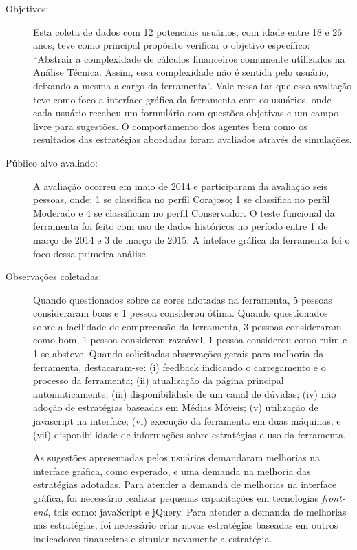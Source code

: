 \begin{description}

\item[Objetivos:]
Esta coleta de dados com 12 potenciais usuários, com idade entre 18 e 26 anos, teve como principal propósito verificar o objetivo específico: “Abstrair a complexidade de cálculos financeiros comumente utilizados na Análise Técnica. Assim, essa complexidade não é sentida pelo usuário, deixando a mesma a cargo da ferramenta”. Vale ressaltar que essa avaliação teve como foco a interface gráfica da ferramenta com os usuários, onde cada usuário recebeu um formulário com questões objetivas e um campo livre para sugestões. O comportamento dos agentes bem como os resultados das estratégias abordadas foram avaliados através de simulações.

\item[Público alvo avaliado:]

A avaliação ocorreu em maio de 2014 e participaram da avaliação seis pessoas, onde: 1 se classifica no perfil Corajoso; 1 se classifica no perfil Moderado e 4 se classificam no perfil Conservador. O teste funcional da ferramenta foi feito com uso de dados históricos no período entre 1 de março de 2014 e 3 de março de 2015. A inteface gráfica da ferramenta foi o foco dessa primeira análise.

\item[Observações coletadas:]
Quando questionados sobre as cores adotadas na ferramenta, 5 pessoas consideraram boas e 1 pessoa considerou ótima. Quando questionados sobre a facilidade de compreensão da ferramenta, 3 pessoas consideraram como bom, 1 pessoa considerou razoável, 1 pessoa considerou como ruim e 1 se absteve. Quando solicitadas observações gerais para melhoria da ferramenta, destacaram-se: (i) feedback indicando o carregamento e o processo da ferramenta; (ii) atualização da página principal automaticamente; (iii) disponibilidade de um canal de dúvidas; (iv) não adoção de estratégias baseadas em Médias Móveis; (v) utilização de javascript na interface; (vi) execução da ferramenta em duas máquinas, e (vii) disponibilidade de informações sobre estratégias e uso da ferramenta.

As sugestões apresentadas pelos usuários demandaram melhorias na interface gráfica, como esperado, e uma demanda na melhoria das estratégias adotadas. Para atender a demanda de melhorias na interface gráfica, foi necessário realizar pequenas capacitações em tecnologias \textit{front-end}, tais como: javaScript e jQuery. Para atender a demanda de melhorias nas estratégias, foi necessário criar novas estratégias baseadas em outros indicadores financeiros e simular novamente a estratégia.


\end{description}
